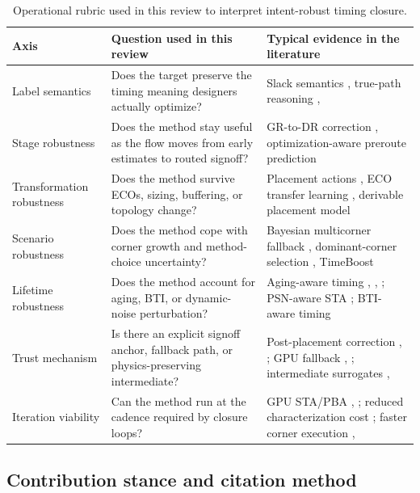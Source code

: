 \documentclass[num-refs]{wiley-article}
\begin{document}
  \begin{table}[tbp]
  \centering
  \caption{Operational rubric used in this review to interpret intent-robust timing closure.}
  \label{tab:wiley-2}
  \small
  \begin{tabularx}{\textwidth}{>{\raggedright\arraybackslash}X >{\raggedright\arraybackslash}X >{\raggedright\arraybackslash}X}
  \toprule
  \textbf{Axis} & \textbf{Question used in this review} & \textbf{Typical evidence in the literature} \\
  \midrule
  Label semantics & Does the target preserve the timing meaning designers actually optimize? & Slack semantics \cite{ref50}, true-path reasoning \cite{ref37}, \cite{ref40} \\
  Stage robustness & Does the method stay useful as the flow moves from early estimates to routed signoff? & GR-to-DR correction \cite{ref10}, optimization-aware preroute prediction \cite{ref8} \\
  Transformation robustness & Does the method survive ECOs, sizing, buffering, or topology change? & Placement actions \cite{ref1}, ECO transfer learning \cite{ref19}, derivable placement model \cite{ref3} \\
  Scenario robustness & Does the method cope with corner growth and method-choice uncertainty? & Bayesian multicorner fallback \cite{ref16}, dominant-corner selection \cite{ref28}, TimeBoost \cite{ref9} \\
  Lifetime robustness & Does the method account for aging, BTI, or dynamic-noise perturbation? & Aging-aware timing \cite{ref14}, \cite{ref15}, \cite{ref23}; PSN-aware STA \cite{ref12}; BTI-aware timing \cite{ref44} \\
  Trust mechanism & Is there an explicit signoff anchor, fallback path, or physics-preserving intermediate? & Post-placement correction \cite{ref25}, \cite{ref13}; GPU fallback \cite{ref21}, \cite{ref22}; intermediate surrogates \cite{ref17}, \cite{ref29} \\
  Iteration viability & Can the method run at the cadence required by closure loops? & GPU STA/PBA \cite{ref21}, \cite{ref22}; reduced characterization cost \cite{ref4}; faster corner execution \cite{ref16}, \cite{ref28} \\
  \bottomrule
  \end{tabularx}
  \end{table}


  \subsection{Contribution stance and citation method}
\end{document}
